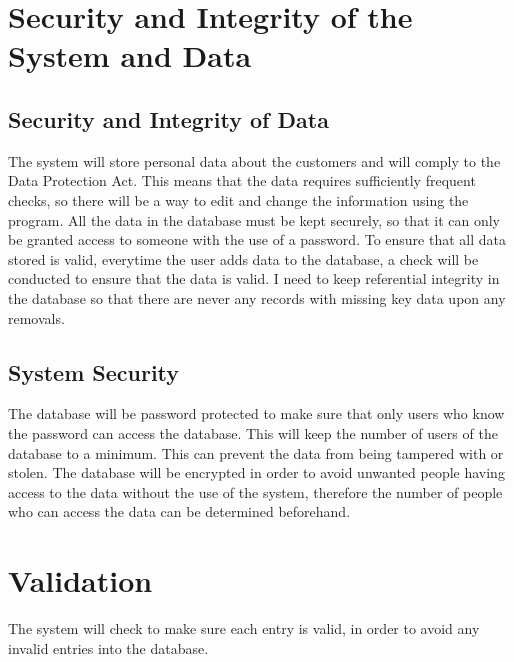 \section{Security and Integrity of the System and Data}

\subsection{Security and Integrity of Data}

The system will store personal data about the customers and will comply to the Data Protection Act. This means that the data requires sufficiently frequent checks, so there will be a way to edit and change the information using the program. All the data in the database must be kept securely, so that it can only be granted access to someone with the use of a password. To ensure that all data stored is valid, everytime the user adds data to the database, a check will be conducted to ensure that the data is valid. I need to keep referential integrity in the database so that there are never any records with missing key data upon any removals.

\subsection{System Security}

The database will be password protected to make sure that only users who know the password can access the database. This will keep the number of users of the database to a minimum. This can prevent the data from being tampered with or stolen. The database will be encrypted in order to avoid unwanted people having access to the data without the use of the system, therefore the number of people who can access the data can be determined beforehand.
\section{Validation}

The system will check to make sure each entry is valid, in order to avoid any invalid entries into the database. 
 

